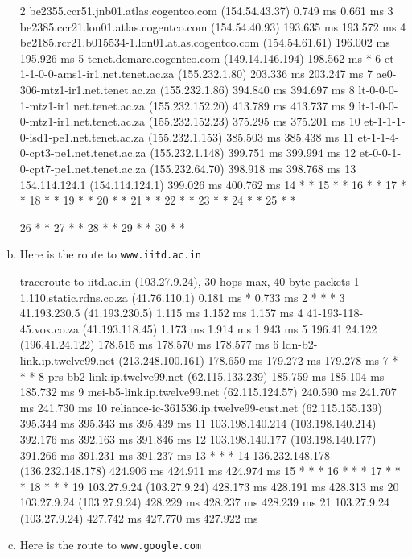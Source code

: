 \documentclass{article}
\begin{document}
\begin{enumerate}[a.]
\begin{code}
 2  be2355.ccr51.jnb01.atlas.cogentco.com (154.54.43.37)  0.749 ms  0.661 ms
 3  be2385.ccr21.lon01.atlas.cogentco.com (154.54.40.93)  193.635 ms  193.572 ms
 4  be2185.rcr21.b015534-1.lon01.atlas.cogentco.com (154.54.61.61)  196.002 ms  195.926 ms
 5  tenet.demarc.cogentco.com (149.14.146.194)  198.562 ms *
 6  et-1-1-0-0-ams1-ir1.net.tenet.ac.za (155.232.1.80)  203.336 ms  203.247 ms
 7  ae0-306-mtz1-ir1.net.tenet.ac.za (155.232.1.86)  394.840 ms  394.697 ms
 8  lt-0-0-0-1-mtz1-ir1.net.tenet.ac.za (155.232.152.20)  413.789 ms  413.737 ms
 9  lt-1-0-0-0-mtz1-ir1.net.tenet.ac.za (155.232.152.23)  375.295 ms  375.201 ms
10  et-1-1-1-0-isd1-pe1.net.tenet.ac.za (155.232.1.153)  385.503 ms  385.438 ms
11  et-1-1-4-0-cpt3-pe1.net.tenet.ac.za (155.232.1.148)  399.751 ms  399.994 ms
12  et-0-0-1-0-cpt7-pe1.net.tenet.ac.za (155.232.64.70)  398.918 ms  398.768 ms
13  154.114.124.1 (154.114.124.1)  399.026 ms  400.762 ms
14  * *
15  * *
16  * *
17  * *
18  * *
19  * *
20  * *
21  * *
22  * *
23  * *
24  * *
25  * *
\end{code}
\begin{code}
26  * *
27  * *
28  * *
29  * *
30  * *
\end{code}
\item Here is the route to {\tt www.iitd.ac.in}
\begin{code}
 traceroute to iitd.ac.in (103.27.9.24), 30 hops max, 40 byte packets
 1  1.110.static.rdns.co.za (41.76.110.1)  0.181 ms *  0.733 ms
 2  * * *
 3  41.193.230.5 (41.193.230.5)  1.115 ms  1.152 ms  1.157 ms
 4  41-193-118-45.vox.co.za (41.193.118.45)  1.173 ms  1.914 ms  1.943 ms
 5  196.41.24.122 (196.41.24.122)  178.515 ms  178.570 ms  178.577 ms
 6  ldn-b2-link.ip.twelve99.net (213.248.100.161)  178.650 ms  179.272 ms  179.278 ms
 7  * * *
 8  prs-bb2-link.ip.twelve99.net (62.115.133.239)  185.759 ms  185.104 ms  185.732 ms
 9  mei-b5-link.ip.twelve99.net (62.115.124.57)  240.590 ms  241.707 ms  241.730 ms
10  reliance-ic-361536.ip.twelve99-cust.net (62.115.155.139)  395.344 ms  395.343 ms  395.439 ms
11  103.198.140.214 (103.198.140.214)  392.176 ms  392.163 ms  391.846 ms
12  103.198.140.177 (103.198.140.177)  391.266 ms  391.231 ms  391.237 ms
13  * * *
14  136.232.148.178 (136.232.148.178)  424.906 ms  424.911 ms  424.974 ms
15  * * *
16  * * *
17  * * *
18  * * *
19  103.27.9.24 (103.27.9.24)  428.173 ms  428.191 ms  428.313 ms
20  103.27.9.24 (103.27.9.24)  428.229 ms  428.237 ms  428.239 ms
21  103.27.9.24 (103.27.9.24)  427.742 ms  427.770 ms  427.922 ms
\end{code}
\item Here is the route to {\tt www.google.com}

\end{enumerate}
\end{document}

